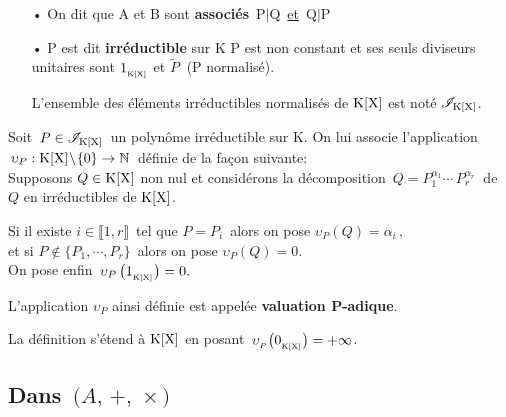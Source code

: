 \begin{itemize}[leftmargin=0.5cm]
    \item[•] On dit que A et B sont \textbf{associés} \ssi \,P$\mid$Q\, \underline{et}\, Q$\mid$P

    \item[•] P est dit \textbf{irréductible} sur K \ssi P est non constant et ses seuls diviseurs unitaires sont $1_{_{\text{K}[\text{X}]}}$ et $\tilde{P}\:$ (P normalisé).\\ \begin{small}L'ensemble des éléments irréductibles normalisés de $\text{K}[\text{X}]$ est noté $\mathscr{I}_{\text{K}[\text{X}]}$.\end{small}

\end{itemize}

\vspace{1cm}

\noindent Soit $\,P\in \mathscr{I}_{\text{K}[\text{X}]}\,$ un polynôme irréductible sur K. On lui associe l'application \(\,\upsilon_P :\text{K}[\text{X}]\!\setminus\!\{0\} \to \mathbb{N}\,\) définie de la façon suivante:\vspace{0.2cm}\\
Supposons $Q\in \text{K}[\text{X}]$ non nul et considérons la décomposition \(\,Q=P_1^{\alpha_1}\cdots\, P_r^{\alpha_r}\:\) de $Q$ en irréductibles de $\text{K}[\text{X}]$.\vspace{-0.4cm}
\begin{center}
Si il existe \(i\in \llbracket 1,r \rrbracket\,\) tel que $P=P_i\,$ alors on pose $\upsilon_P(Q)=\alpha_i\,,$\vspace{0.1cm}\\
et si \(P\notin \{P_1,\cdots,P_r\}\,\) alors on pose $\upsilon_P(Q)=0.$\vspace{0.1cm}\\
On pose enfin $\,\upsilon_P\,\bigl(1_{_{\text{K}[\text{X}]}}\bigr)=0.$
\end{center}
L'application $\upsilon_P$ ainsi définie est appelée \textbf{valuation P-adique}.\vspace{0.1cm}\\
\begin{small}
    La définition s'étend à $\text{K}[\text{X}]$ en posant $\,\upsilon_{_P}\bigl(0_{_{\text{K}[\text{X}]}}\bigr)=+\infty$.
\end{small}

\vspace{1.5cm}

\subsection{Dans $\,\bigl(A,\,+,\,\times\bigr)$}

